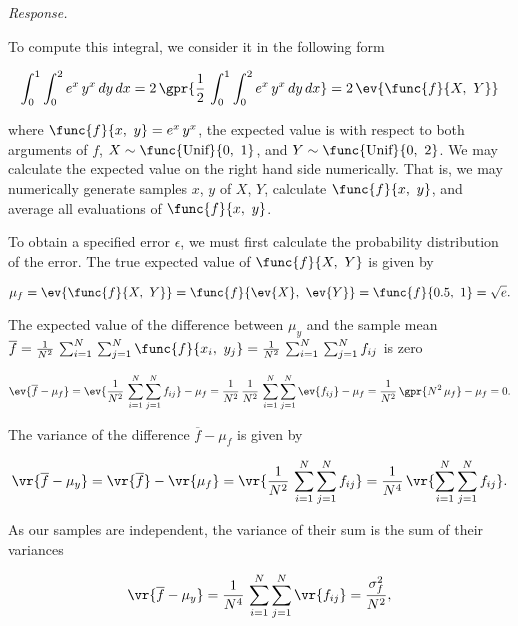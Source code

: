 \textit{Response.} 

To compute this integral, we consider it in the following form

\begin{equation}
	\int_{0}^{1} \int_{0}^{2} e^{x}\,y^{x}\,dy\,dx = 2\,\gpr{\frac{1}{2}\,\int_{0}^{1} \int_{0}^{2} e^{x}\,y^{x}\,dy\,dx} = 2\,\ev{\func{f}{X,\ Y}}
\end{equation}

where $\func{f}{x,\ y} = e^x\,y^x$, the expected value is with respect to both arguments of $f$, $X \sim \func{\text{Unif}}{0,\ 1}$, and $Y \sim \func{\text{Unif}}{0,\ 2}$. We may calculate the expected value on the right hand side numerically. That is, we may numerically generate samples $x$, $y$ of $X$, $Y$, calculate $\func{f}{x,\ y}$, and average all evaluations of $\func{f}{x,\ y}$.

To obtain a specified error $\epsilon$, we must first calculate the probability distribution of the error. The true expected value of $\func{f}{X,\ Y}$ is given by

\begin{equation}
	\mu_f = \ev{\func{f}{X,\ Y}} = \func{f}{\ev{X},\ \ev{Y}} = \func{f}{0.5,\ 1} = \sqrt{e}.
\end{equation}

The expected value of the difference between $\mu_y$ and the sample mean $\overline{f} = \frac{1}{N^2}\,\sum_{i = 1}^{N}\,\sum_{j = 1}^{N} \func{f}{x_i,\ y_j} = \frac{1}{N^2}\,\sum_{i = 1}^{N}\,\sum_{j = 1}^{N} f_{ij}$ is zero

\begin{equation}
	\ev{\overline{f} - \mu_{f}} = \ev{\frac{1}{N^2}\,\sum_{i = 1}^{N} \sum_{j = 1}^{N} f_{ij}} - \mu_f = \frac{1}{N^2}\,\frac{1}{N^2}\,\sum_{i = 1}^{N} \sum_{j = 1}^{N} \ev{f_{ij}} - \mu_f = \frac{1}{N^2}\,\gpr{N^2\,\mu_f} - \mu_f = 0.
\end{equation}

The variance of the difference $\overline{f} - \mu_{f}$ is given by

\begin{equation}
	\vr{\overline{f} - \mu_y} = \vr{\overline{f}} - \vr{\mu_{f}} = \vr{\frac{1}{N^2}\,\sum_{i = 1}^{N} \sum_{j = 1}^{N} f_{ij}} = \frac{1}{N^4}\,\vr{\sum_{i = 1}^{N} \sum_{j = 1}^{N} f_{ij}}.
\end{equation}

As our samples are independent, the variance of their sum is the sum of their variances

\begin{equation}
	\vr{\overline{f} - \mu_y} = \frac{1}{N^4}\,\sum_{i = 1}^{N} \sum_{j = 1}^{N} \vr{f_{ij}} = \frac{\sigma_{f}^2}{N^2},
\end{equation}

